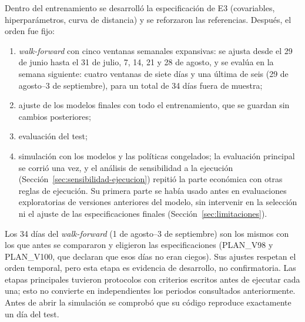 Dentro del entrenamiento se desarrolló la especificación de E3 (covariables, hiperparámetros, curva de distancia) y se reforzaron las referencias. Después, el orden fue fijo:
\begin{enumerate}[nosep]
\item \textit{walk-forward} con cinco ventanas semanales expansivas: se ajusta desde el 29 de junio hasta el 31 de julio, 7, 14, 21 y 28 de agosto, y se evalúa en la semana siguiente: cuatro ventanas de siete días y una última de seis (29 de agosto--3 de septiembre), para un total de 34 días fuera de muestra;
\item ajuste de los modelos finales con todo el entrenamiento, que se guardan sin cambios posteriores;
\item evaluación del test;
\item simulación con los modelos y las políticas congelados; la evaluación principal se corrió una vez, y el análisis de sensibilidad a la ejecución (Sección~\ref{sec:sensibilidad-ejecucion}) repitió la parte económica con otras reglas de ejecución. Su primera parte se había usado antes en evaluaciones exploratorias de versiones anteriores del modelo, sin intervenir en la selección ni el ajuste de las especificaciones finales (Sección~\ref{sec:limitaciones}).
\end{enumerate}
Los 34 días del \textit{walk-forward} (1 de agosto--3 de septiembre) son los mismos con los que antes se compararon y eligieron las especificaciones (PLAN\_V98 y PLAN\_V100, que declaran que esos días no eran ciegos). Sus ajustes respetan el orden temporal, pero esta etapa es evidencia de desarrollo, no confirmatoria. Las etapas principales tuvieron protocolos con criterios escritos antes de ejecutar cada una; esto no convierte en independientes los periodos consultados anteriormente. Antes de abrir la simulación se comprobó que su código reproduce exactamente un día del test.

